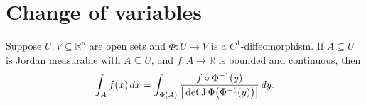 
\section{Change of variables}
\label{sec:change_of_variables}

\begin{theorem}
\label{thm:change_of_variables}
Suppose $U,V \subseteq \mathbb{R}^n$ are open sets and $\Phi : U \to V$ is a
$C^1$-diffeomorphism. If $A \subseteq U$ is Jordan measurable with $\overline{A} \subseteq U$,
and $f : A \to \mathbb{R}$ is bounded and continuous, then
\[\int_A f(x)\,dx
  = \int_{\Phi(A)} \frac{f\circ\Phi^{-1}(y)}{\big|\det \operatorname{J}\Phi\big(\Phi^{-1}(y)\big)\big|}\,dy.\]
\end{theorem}

